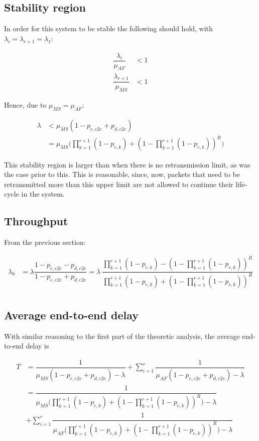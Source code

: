 \subsection{Stability region}

In order for this system to be stable the following should hold, with
$\lambda_i = \lambda_{r+1} = \lambda_1$:

\begin{align*}
  \dfrac{\lambda_i}{\mu_{AF}} &< 1 \\
  \dfrac{\lambda_{r+1}}{\mu_{MS}} &< 1
\end{align*}

Hence, due to $\mu_{MS} = \mu_{AF}$:

\begin{align*}
  \lambda &< \mu_{MS} (1 - p_{e,e2e} + p_{d,e2e}) \\
          &= \mu_{MS}\Big(\prod_{k=1}^{r+1} (1 - p_{e,k}) + (1 - \prod_{k=1}^{r+1} (1 - p_{e,k}))^R\Big)
\end{align*}

This stability region is larger than when there is no retransmission limit, as
was the case prior to this. This is reasonable, since, now, packets that need to
be retransmitted more than this upper limit are not allowed to continue their
life-cycle in the system.


\subsection{Throughput}

From the previous section:

\begin{align*}
  \lambda_0 &= \lambda \dfrac{1 - p_{e,e2e} - p_{d,e2e}}{1 - p_{e,e2e} + p_{d,e2e}} =
  \lambda\ \dfrac{\prod\limits_{k=1}^{r+1} (1 - p_{e,k}) - (1 - \prod\limits_{k=1}^{r+1} (1 - p_{e,k}))^R}
        {\prod\limits_{k=1}^{r+1} (1 - p_{e,k}) + (1 - \prod\limits_{k=1}^{r+1} (1 - p_{e,k}))^R} \\
\end{align*}


\subsection{Average end-to-end delay}

With similar reasoning to the first part of the theoretic analysis, the average
end-to-end delay is

\begin{align*}
  T &= \dfrac{1}{\mu_{MS}(1 - p_{e,e2e} + p_{d,e2e}) - \lambda} +
    \sum\limits_{i=1}^r \dfrac{1}{\mu_{AF}(1 - p_{e,e2e} + p_{d,e2e}) - \lambda} \\
    &= \dfrac{1}{\mu_{MS}\Big(\prod\limits_{k=1}^{r+1}(1-p_{e,k}) + (1 - \prod\limits_{k=1}^{r+1}(1-p_{e,k}))^R \Big) - \lambda} \\
    &+ \sum\limits_{i=1}^r \dfrac{1}{\mu_{AF}\Big(\prod\limits_{k=1}^{r+1}(1-p_{e,k}) + (1 - \prod\limits_{k=1}^{r+1}(1-p_{e,k}))^R \Big) - \lambda}
\end{align*}
